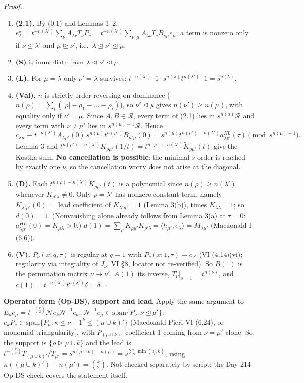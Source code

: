 \documentclass[10pt]{article}
\newcommand{\N}{\mathcal{N}}
\newcommand{\R}{\mathcal{R}}
\newcommand{\Kt}{\widetilde K}
\newcommand{\dom}{\trianglerighteq}
\newcommand{\domle}{\trianglelefteq}
\begin{document}
\noindent\emph{Proof.}
\begin{enumerate}
\item \textbf{(2.1).} By (0.1) and Lemmas 1--2, $e^\star_\lambda=t^{-n(\lambda')}\sum_\nu A_{\lambda\nu}T_\nu P_\nu=t^{-n(\lambda')}\sum_{\nu,\mu}A_{\lambda\nu}T_\nu B_{\nu\mu}e_\mu$; a term is nonzero only if $\nu\domle\lambda'$ and $\mu\dom\nu'$, i.e.\ $\lambda\domle\nu'\domle\mu$.
\item \textbf{(S)} is immediate from $\lambda\domle\nu'\domle\mu$.
\item \textbf{(L).} For $\mu=\lambda$ only $\nu'=\lambda$ survives: $t^{-n(\lambda')}\cdot1\cdot s^{n(\lambda)}t^{n(\lambda')}\cdot1=s^{n(\lambda)}$.
\item \textbf{(Val).} $n$ is strictly order-reversing on dominance ($n(\rho)=\sum_i(|\rho|-\rho_1-\dots-\rho_i)$), so $\nu'\domle\mu$ gives $n(\nu')\ge n(\mu)$, with equality only if $\nu'=\mu$. Since $A,B\in\R$, every term of (2.1) lies in $s^{n(\mu)}\R$ and every term with $\nu\ne\mu'$ lies in $s^{n(\mu)+1}\R$. Hence
\[
c_{\lambda\mu}\equiv t^{-n(\lambda')}A_{\lambda\mu'}(0)\,s^{n(\mu)}t^{n(\mu')}B_{\mu'\mu}(0)=s^{n(\mu)}t^{n(\mu')-n(\lambda')}a^{HL}_{\lambda\mu'}(\tau)\pmod{s^{n(\mu)+1}}.
\]
Lemma 3 and $t^{n(\mu')-n(\lambda')}K_{\rho\mu'}(1/t)=t^{n(\rho)-n(\lambda')}\Kt_{\rho\mu'}(t)$ give the Kostka sum.
\textbf{No cancellation is possible}: the minimal $s$-order is reached by exactly one $\nu$, so the cancellation worry does not arise at the diagonal.
\item \textbf{(D).} Each $t^{n(\rho)-n(\lambda')}\Kt_{\rho\mu'}(t)$ is a polynomial since $n(\rho)\ge n(\lambda')$ whenever $K_{\rho'\lambda}\ne0$. Only $\rho=\lambda'$ has nonzero constant term, namely $\Kt_{\lambda'\mu'}(0)=$ lead coefficient of $K_{\lambda'\mu'}=1$ (Lemma 3(b)), times $K_{\lambda\lambda}=1$; so $d(0)=1$. (Nonvanishing alone already follows from Lemma 3(a) at $\tau=0$: $a^{HL}_{\lambda\mu'}(0)=K_{\mu\lambda}>0$.) $d(1)=\sum_\rho K_{\rho\mu'}K_{\rho'\lambda}=\langle h_{\mu'},e_\lambda\rangle=M_{\lambda\mu'}$ (Macdonald I (6.6)).
\item \textbf{(V).} $P_\nu(x;q,\tau)$ is regular at $q=1$ with $P_\nu(x;1,\tau)=e_{\nu'}$ (VI (4.14)(vi); regularity via integrality of $J_\nu$, VI \S8, locator not re-verified). So $B(1)$ is the permutation matrix $\nu\mapsto\nu'$, $A(1)$ its inverse, $T_\nu|_{s=1}=t^{n(\nu)}$, and $c(1)=t^{-n(\lambda')}t^{n(\lambda')}\delta=\delta$. $\square$
\end{enumerate}

\noindent\textbf{Operator form (Op-DS), support and lead.} Apply the same argument to $E_ke_\mu=t^{-\binom k2}\N e_k\N^{-1}e_\mu$:
$\N^{-1}e_\mu\in\mathrm{span}\{P_\nu:\nu\domle\mu'\}$; $e_kP_\nu\in\mathrm{span}\{P_\kappa:\kappa\domle\nu+1^k\domle(\mu\cup k)'\}$ (Macdonald Pieri VI (6.24), or monomial triangularity), with $P_{(\mu\cup k)'}$-coefficient $1$ coming from $\nu=\mu'$ alone.
So the support is $\{\rho\dom\mu\cup k\}$ and the lead is $t^{-\binom k2}T_{(\mu\cup k)'}/T_{\mu'}=s^{n(\mu\cup k)-n(\mu)}=s^{\sum_i\min(\mu_i,k)}$, using $n((\mu\cup k)')-n(\mu')=\binom k2$. Not checked separately by script; the Day 214 Op-DS check covers the statement itself.
\end{document}
